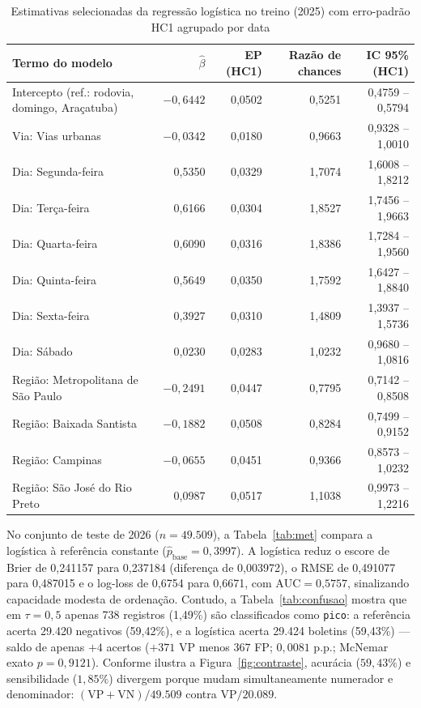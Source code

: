 \documentclass[
  article,
  12pt,
  oneside,
  a4paper,
  section=TITLE,
  english,
  brazil
]{abntex2}\usepackage[]{graphicx}\usepackage[]{xcolor}
\begin{document}
\begin{table}[htbp]
  \centering
  \SingleSpacing
  \caption{Estimativas selecionadas da regressão logística no treino (2025) com erro-padrão HC1 agrupado por data}
  \label{tab:coefs}
  \footnotesize
  \renewcommand{\arraystretch}{0.92}

\begin{tabular}{lrrrr}
\toprule
Termo do modelo & $\hat{\beta}$ & EP (HC1) & Razão de chances & IC 95\% (HC1)\\
\midrule
Intercepto (ref.: rodovia, domingo, Araçatuba) & $-0,6442$ & 0,0502 & 0,5251 & 0,4759 -- 0,5794\\
Via: Vias urbanas & $-0,0342$ & 0,0180 & 0,9663 & 0,9328 -- 1,0010\\
Dia: Segunda-feira & 0,5350 & 0,0329 & 1,7074 & 1,6008 -- 1,8212\\
Dia: Terça-feira & 0,6166 & 0,0304 & 1,8527 & 1,7456 -- 1,9663\\
Dia: Quarta-feira & 0,6090 & 0,0316 & 1,8386 & 1,7284 -- 1,9560\\
\addlinespace
Dia: Quinta-feira & 0,5649 & 0,0350 & 1,7592 & 1,6427 -- 1,8840\\
Dia: Sexta-feira & 0,3927 & 0,0310 & 1,4809 & 1,3937 -- 1,5736\\
Dia: Sábado & 0,0230 & 0,0283 & 1,0232 & 0,9680 -- 1,0816\\
Região: Metropolitana de São Paulo & $-0,2491$ & 0,0447 & 0,7795 & 0,7142 -- 0,8508\\
Região: Baixada Santista & $-0,1882$ & 0,0508 & 0,8284 & 0,7499 -- 0,9152\\
\addlinespace
Região: Campinas & $-0,0655$ & 0,0451 & 0,9366 & 0,8573 -- 1,0232\\
Região: São José do Rio Preto & 0,0987 & 0,0517 & 1,1038 & 0,9973 -- 1,2216\\
\bottomrule
\end{tabular}

\end{table}

No conjunto de teste de 2026 ($n = \text{49.509}$), a Tabela~\ref{tab:met} compara a logística à referência constante ($\hat{p}_{\mathrm{base}} = 0{,}3997$). A logística reduz o escore de Brier de 0,241157 para 0,237184 (diferença de 0,003972), o RMSE de 0,491077 para 0,487015 e o log-loss de 0,6754 para 0,6671, com $\mathrm{AUC} = \text{0,5757}$, sinalizando capacidade modesta de ordenação. Contudo, a Tabela~\ref{tab:confusao} mostra que em $\tau = 0{,}5$ apenas 738 registros (1,49\%) são classificados como \texttt{pico}: a referência acerta 29.420 negativos (59,42\%), e a logística acerta 29.424 boletins (59,43\%) --- saldo de apenas $+4$ acertos ($+371$ VP menos $367$ FP; $0{,}0081$ p.p.; McNemar exato $p = 0{,}9121$). Conforme ilustra a Figura~\ref{fig:contraste}, acurácia ($59{,}43\%$) e sensibilidade ($1{,}85\%$) divergem porque mudam simultaneamente numerador e denominador: $(\mathrm{VP}+\mathrm{VN})/49.509$ contra $\mathrm{VP}/20.089$.
\end{document}
